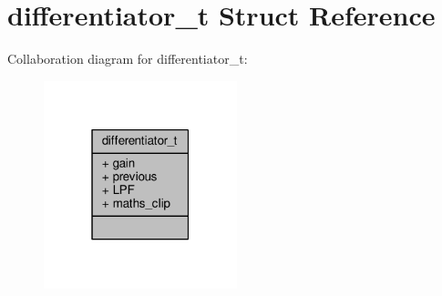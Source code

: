 \hypertarget{structdifferentiator__t}{\section{differentiator\+\_\+t Struct Reference}
\label{structdifferentiator__t}
}


Collaboration diagram for differentiator\+\_\+t\+:
\nopagebreak
\begin{figure}[H]
\begin{center}
\leavevmode
\includegraphics[width=159pt]{structdifferentiator__t__coll__graph}
\end{center}
\end{figure}
